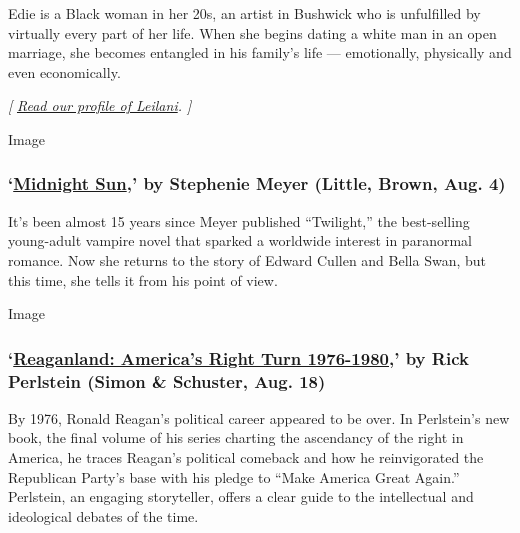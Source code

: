 Edie is a Black woman in her 20s, an artist in Bushwick who is
unfulfilled by virtually every part of her life. When she begins dating
a white man in an open marriage, she becomes entangled in his family's
life --- emotionally, physically and even economically.

\emph{{[}}
\href{https://www.nytimes3xbfgragh.onion/2020/07/31/books/raven-leilani-luster.html}{\emph{Read
our profile of Leilani}}\emph{. {]}}

Image

\hypertarget{midnight-sun-by-stephenie-meyer-little-brown-aug-4}{%
\subsubsection{\texorpdfstring{`\href{https://www.hachettebookgroup.com/titles/stephenie-meyer/midnight-sun/9780316592253/}{Midnight
Sun},' by Stephenie Meyer (Little, Brown, Aug.
4)}{`Midnight Sun,' by Stephenie Meyer (Little, Brown, Aug. 4)}}\label{midnight-sun-by-stephenie-meyer-little-brown-aug-4}}

It's been almost 15 years since Meyer published ``Twilight,'' the
best-selling young-adult vampire novel that sparked a worldwide interest
in paranormal romance. Now she returns to the story of Edward Cullen and
Bella Swan, but this time, she tells it from his point of view.

Image

\hypertarget{reaganland-americas-right-turn-1976-1980-by-rick-perlstein-simon--schuster-aug-18}{%
\subsubsection{\texorpdfstring{`\href{https://www.simonandschuster.com/books/Reaganland/Rick-Perlstein/9781476793054}{Reaganland:
America's Right Turn 1976-1980},' by Rick Perlstein (Simon \& Schuster,
Aug.
18)}{`Reaganland: America's Right Turn 1976-1980,' by Rick Perlstein (Simon \& Schuster, Aug. 18)}}\label{reaganland-americas-right-turn-1976-1980-by-rick-perlstein-simon--schuster-aug-18}}

By 1976, Ronald Reagan's political career appeared to be over. In
Perlstein's new book, the final volume of his series charting the
ascendancy of the right in America, he traces Reagan's political
comeback and how he reinvigorated the Republican Party's base with his
pledge to ``Make America Great Again.'' Perlstein, an engaging
storyteller, offers a clear guide to the intellectual and ideological
debates of the time.


